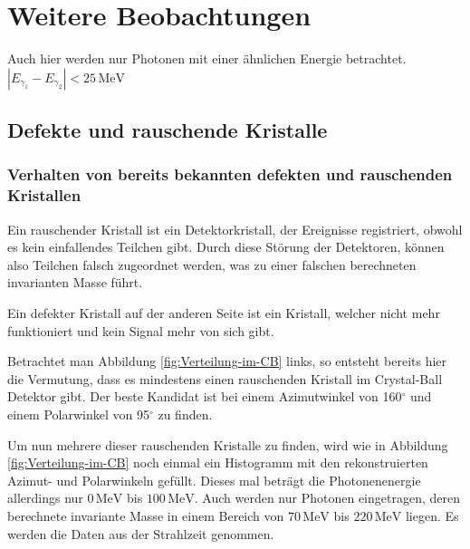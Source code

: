 \documentclass[a4paper,11pt,oneside,final,german,openbib,pdftex]{scrbook}
\begin{document}
{\chapter{Weitere Beobachtungen}
\label{sec:Weitere-Beobachtungen}

Auch hier werden nur Photonen mit einer \"ahnlichen Energie betrachtet. $|E_{\gamma_1}-E_{\gamma_2}|<25\,\text{MeV}$


\section{Defekte und rauschende Kristalle}


\subsection{Verhalten von bereits bekannten defekten und rauschenden Kristallen}
\label{sec:Bekannte-Dead-Crystals}
Ein rauschender Kristall ist ein Detektorkristall, der Ereignisse registriert, obwohl es kein einfallendes Teilchen gibt. Durch diese St\"orung der Detektoren, k\"onnen also Teilchen falsch zugeordnet werden, was zu einer falschen berechneten invarianten Masse f\"uhrt. 

Ein defekter Kristall auf der anderen Seite ist ein Kristall, welcher nicht mehr funktioniert und kein Signal mehr von sich gibt.

Betrachtet man Abbildung \ref{fig:Verteilung-im-CB} links, so entsteht bereits hier die Vermutung, dass es mindestens einen rauschenden Kristall im Crystal-Ball Detektor gibt. Der beste Kandidat ist bei einem Azimutwinkel von 160$^{\circ}$ und einem Polarwinkel von 95$^{\circ}$ zu finden.

Um nun mehrere dieser rauschenden Kristalle zu finden, wird wie in Abbildung \ref{fig:Verteilung-im-CB} noch einmal ein Histogramm mit den rekonstruierten Azimut- und Polarwinkeln gef\"ullt. Dieses mal betr\"agt die Photonenenergie allerdings nur $0\,\text{MeV}$ bis $100\,\text{MeV}$. Auch werden nur Photonen eingetragen, deren berechnete invariante Masse in einem Bereich von $70\,\text{MeV}$ bis $220\, \text{MeV}$ liegen. Es werden die Daten aus der Strahlzeit genommen.

}
\end{document}
